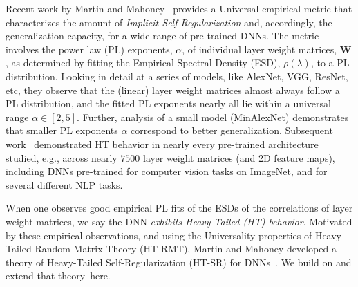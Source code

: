 Recent work by Martin and Mahoney~\cite{MM18_TR} provides a Universal empirical metric that characterizes the amount of \emph{Implicit Self-Regularization} and, accordingly, the generalization capacity, for a wide range of pre-trained DNNs.
The metric involves the power law (PL) exponents, $\alpha$, of individual layer weight matrices, $\mathbf{W}$, as determined by fitting the Empirical Spectral Density (ESD), $\rho(\lambda)$, to a PL distribution.
Looking in detail at a series of models, like AlexNet, VGG, ResNet, etc, they observe that the (linear) layer weight matrices almost always follow a PL distribution, and the fitted PL exponents nearly all lie within a universal range $\alpha\in[2,5]$. 
Further, analysis of a small model (MinAlexNet) demonstrates that smaller PL exponents $\alpha$ correspond to better generalization.
Subsequent work~\cite{MM18_unpub_work} demonstrated HT behavior in nearly every pre-trained architecture studied, e.g., across nearly $7500$ layer weight matrices (and 2D feature maps), including DNNs pre-trained for computer vision tasks on ImageNet, and for several different NLP tasks.

When one observes good empirical PL fits of the ESDs of the correlations of layer weight matrices, we say the DNN \emph{exhibits Heavy-Tailed (HT) behavior}.
Motivated by these empirical observations, and using the Universality properties of Heavy-Tailed Random Matrix Theory (HT-RMT), Martin and Mahoney developed a theory of Heavy-Tailed Self-Regularization (HT-SR) for DNNs~\cite{MM17_TR,MM18_TR}.
We build on and extend that theory~here.

